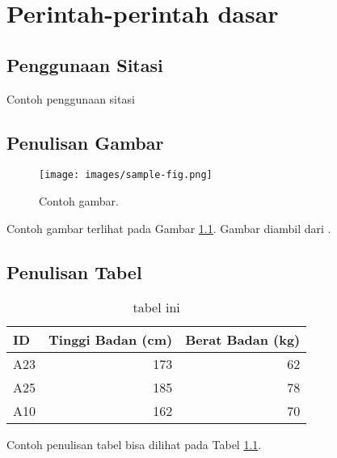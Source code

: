 \chapter{Perintah-perintah dasar}


\section{Penggunaan Sitasi}
Contoh penggunaan sitasi \cite{lukito2016,santosa2011user} \cite{lukito2016,santosa2011user,setiawan2014fuzzy,wibowo2014line}
\cite{setiawan2014fuzzy} \cite{wibowo2014line} \cite{marenda2016digitory} \cite{wibirama2013dual,wibowo2016clustering}

\section{Penulisan Gambar}

\begin{figure}[h]
    \centering
    \texttt{[image: images/sample-fig.png]}
    \caption{Contoh gambar.}
    \label{Fig: Contoh gambar}
\end{figure}

Contoh gambar terlihat pada Gambar \ref{Fig: Contoh gambar}. Gambar diambil dari \cite{wibowo2016clustering}.

\section{Penulisan Tabel}
\begin{table}[h]
    \caption{tabel ini}
    \vspace{0.5em}
    \centering
    \begin{tabular}{|l|r|r|}
        \hline
        ID & Tinggi Badan (cm) & Berat Badan (kg) \\
        \hline \hline
        A23 & 173 & 62 \\
        A25 & 185 & 78 \\
        A10 & 162 & 70 \\ \hline
    \end{tabular}
    \label{Tab: Tabel Tinggi Berat}
\end{table}

Contoh penulisan tabel bisa dilihat pada Tabel \ref{Tab: Tabel Tinggi Berat}.

